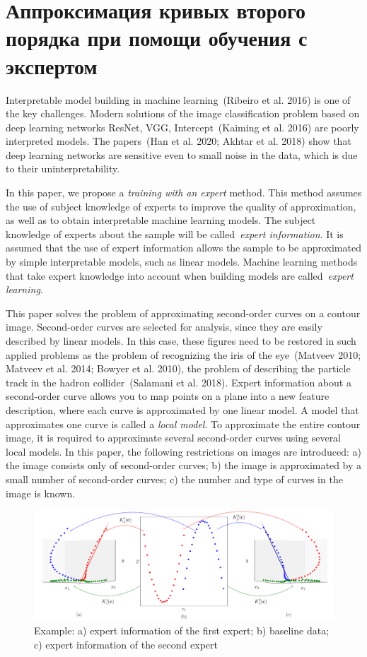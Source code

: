 \newpage

\section{Аппроксимация кривых второго порядка при помощи обучения с экспертом}
Interpretable model building in machine learning~(Ribeiro et al. 2016) is one of the key challenges.
Modern solutions of the image classification problem based on deep learning networks ResNet, VGG, Intercept~(Kaiming et al. 2016) are poorly interpreted models.
The papers~(Han et al. 2020; Akhtar et al. 2018) show that deep learning networks are sensitive even to small noise in the data, which is due to their uninterpretability.

In this paper, we propose a \textit {training with an expert} method.
This method assumes the use of subject knowledge of experts to improve the quality of approximation, as well as to obtain interpretable machine learning models.
The subject knowledge of experts about the sample will be called~\textit {expert information}.
It is assumed that the use of expert information allows the sample to be approximated by simple interpretable models, such as linear models. Machine learning methods that take expert knowledge into account when building models are called~\textit {expert learning}.

This paper solves the problem of approximating second-order curves on a contour image. Second-order curves are selected for analysis, since they are easily described by linear models. In this case, these figures need to be restored in such applied problems as the problem of recognizing the iris of the eye~(Matveev 2010; Matveev et al. 2014; Bowyer et al. 2010), the problem of describing the particle track in the hadron collider~(Salamani et al. 2018). Expert information about a second-order curve allows you to map points on a plane into a new feature description, where each curve is approximated by one linear model. A model that approximates one curve is called a \textit {local model}. To approximate the entire contour image, it is required to approximate several second-order curves using several local models. In this paper, the following restrictions on images are introduced: a) the image consists only of second-order curves; b) the image is approximated by a small number of second-order curves; c) the number and type of curves in the image is known.

\begin{figure}[h!]
     \includegraphics[width=\textwidth]{results/priorexpertfig/explanation}
     \caption {Example: a) expert information of the first expert; b) baseline data; c) expert information of the second expert}
    \label{intro:fig2}
\end{figure}

